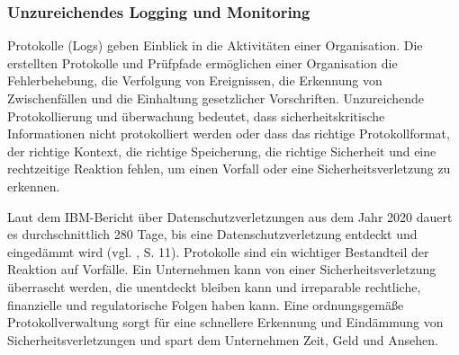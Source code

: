 \subsubsection{Unzureichendes Logging und Monitoring}

Protokolle (Logs) geben Einblick in die Aktivit\"aten einer
Organisation. Die erstellten Protokolle und Pr\"ufpfade 
erm\"oglichen einer Organisation die Fehlerbehebung, die Verfolgung von
Ereignissen, die Erkennung von Zwischenf\"allen und die Einhaltung
gesetzlicher Vorschriften. Unzureichende Protokollierung und \"uberwachung 
bedeutet, dass sicherheitskritische Informationen nicht protokolliert
werden oder dass das richtige Protokollformat, der richtige Kontext,
die richtige Speicherung, die richtige Sicherheit und eine rechtzeitige
Reaktion fehlen, um einen Vorfall oder eine Sicherheitsverletzung zu 
erkennen.

Laut dem IBM-Bericht \"uber Datenschutzverletzungen aus dem Jahr 2020 dauert
es durchschnittlich 280 Tage, bis eine Datenschutzverletzung entdeckt und
einged\"ammt wird (vgl. \cite{ibm-sec}, S. 11). Protokolle sind ein wichtiger
Bestandteil der Reaktion auf Vorf\"alle. Ein Unternehmen kann von einer 
Sicherheitsverletzung \"uberrascht werden, die unentdeckt bleiben kann 
und irreparable rechtliche, finanzielle und regulatorische Folgen 
haben kann. Eine ordnungsgem\"a{\ss}e Protokollverwaltung sorgt f\"ur eine
schnellere Erkennung und Eind\"ammung von Sicherheitsverletzungen und
spart dem Unternehmen Zeit, Geld und Ansehen.